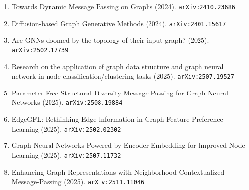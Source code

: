 \documentclass[11pt]{article}
\begin{document}
\begin{enumerate}
  \item Towards Dynamic Message Passing on Graphs (2024). \texttt{arXiv:2410.23686}
  \item Diffusion-based Graph Generative Methods (2024). \texttt{arXiv:2401.15617}
  \item Are GNNs doomed by the topology of their input graph? (2025). \texttt{arXiv:2502.17739}
  \item Research on the application of graph data structure and graph neural network in node classification/clustering tasks (2025). \texttt{arXiv:2507.19527}
  \item Parameter-Free Structural-Diversity Message Passing for Graph Neural Networks (2025). \texttt{arXiv:2508.19884}
  \item EdgeGFL: Rethinking Edge Information in Graph Feature Preference
  Learning (2025). \texttt{arXiv:2502.02302}
  \item Graph Neural Networks Powered by Encoder Embedding for Improved Node Learning (2025). \texttt{arXiv:2507.11732}
  \item Enhancing Graph Representations with Neighborhood-Contextualized Message-Passing (2025). \texttt{arXiv:2511.11046}
\end{enumerate}
\end{document}
